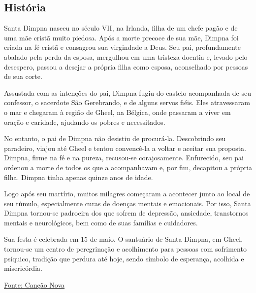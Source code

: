 \documentclass[18pt]{article}
\begin{document}
\begin{justify}
\begin{center}
\section{História}\label{sec:História}
\end{center}

Santa Dimpna nasceu no século VII, na Irlanda, filha de um chefe pagão e de uma mãe cristã muito piedosa. Após a morte precoce de sua mãe, Dimpna foi criada na fé cristã e consagrou sua virgindade a Deus. Seu pai, profundamente abalado pela perda da esposa, mergulhou em uma tristeza doentia e, levado pelo desespero, passou a desejar a própria filha como esposa, aconselhado por pessoas de sua corte.

Assustada com as intenções do pai, Dimpna fugiu do castelo acompanhada de seu confessor, o sacerdote São Gerebrando, e de alguns servos fiéis. Eles atravessaram o mar e chegaram à região de Gheel, na Bélgica, onde passaram a viver em oração e caridade, ajudando os pobres e necessitados.

No entanto, o pai de Dimpna não desistiu de procurá-la. Descobrindo seu paradeiro, viajou até Gheel e tentou convencê-la a voltar e aceitar sua proposta. Dimpna, firme na fé e na pureza, recusou-se corajosamente. Enfurecido, seu pai ordenou a morte de todos os que a acompanhavam e, por fim, decapitou a própria filha. Dimpna tinha apenas quinze anos de idade.

Logo após seu martírio, muitos milagres começaram a acontecer junto ao local de seu túmulo, especialmente curas de doenças mentais e emocionais. Por isso, Santa Dimpna tornou-se padroeira dos que sofrem de depressão, ansiedade, transtornos mentais e neurológicos, bem como de suas famílias e cuidadores.

Sua festa é celebrada em 15 de maio. O santuário de Santa Dimpna, em Gheel, tornou-se um centro de peregrinação e acolhimento para pessoas com sofrimento psíquico, tradição que perdura até hoje, sendo símbolo de esperança, acolhida e misericórdia.

\vfill

\begin{center}
\href{https://santo.cancaonova.com/santo/santa-dimpna-padroeira-dos-doentes-mentais/}{Fonte: Canção Nova}
\end{center}
\end{justify}

\end{document}
